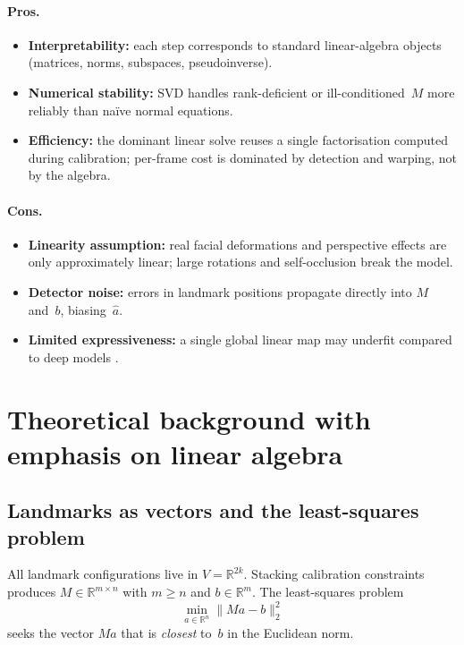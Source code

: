 \documentclass[11pt,a4paper]{article}
\begin{document}
\paragraph{Pros.}
\begin{itemize}
  \item \textbf{Interpretability:} each step corresponds to standard linear-algebra
        objects (matrices, norms, subspaces, pseudoinverse).
  \item \textbf{Numerical stability:} SVD handles rank-deficient or
        ill-conditioned~$M$ more reliably than na\"ive normal equations.
  \item \textbf{Efficiency:} the dominant linear solve reuses a single factorisation
        computed during calibration; per-frame cost is dominated by detection and
        warping, not by the algebra.
\end{itemize}

\paragraph{Cons.}
\begin{itemize}
  \item \textbf{Linearity assumption:} real facial deformations and perspective
        effects are only approximately linear; large rotations and self-occlusion
        break the model.
  \item \textbf{Detector noise:} errors in landmark positions propagate directly
        into $M$ and~$b$, biasing~$\hat{a}$.
  \item \textbf{Limited expressiveness:} a single global linear map may underfit
        compared to deep models
        \cite{siarohin2019first,zakharov2020oneshot}.
\end{itemize}

\section{Theoretical background with emphasis on linear algebra}
\label{sec:theory}

\subsection{Landmarks as vectors and the least-squares problem}

All landmark configurations live in $V = \mathbb{R}^{2k}$. Stacking calibration
constraints produces $M \in \mathbb{R}^{m \times n}$ with $m \ge n$ and
$b \in \mathbb{R}^{m}$. The least-squares problem
\begin{equation}
  \min_{a \in \mathbb{R}^n} \|Ma - b\|_2^2
  \label{eq:ls}
\end{equation}
seeks the vector $Ma$ that is \emph{closest} to~$b$ in the Euclidean norm.
\end{document}
